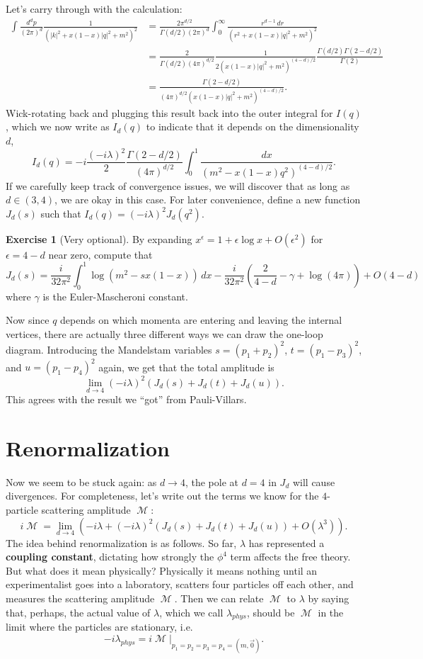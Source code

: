 \documentclass{report}
\theoremstyle{plain}
\theoremstyle{definition}
\newtheorem{exercise}{Exercise}[section]
\theoremstyle{remark}
\DeclareMathOperator{\cM}{\mathcal{M}}
\begin{document}
Let's carry through with the calculation:
\begin{align*}
  \int \frac{d^dp}{(2\pi)^d} \frac{1}{(|k|^2 + x(1 - x)|q|^2 + m^2)^2}
  &= \frac{2\pi^{d/2}}{\Gamma(d/2)(2\pi)^d} \int_0^\infty \frac{r^{d-1} \, dr}{(r^2 + x(1-x)|q|^2 + m^2)^2} \\
  &= \frac{2}{\Gamma(d/2) (4\pi)^{d/2}} \frac{1}{2(x(1-x)|q|^2 + m^2)^{(4-d)/2}} \frac{\Gamma(d/2) \Gamma(2 - d/2)}{\Gamma(2)} \\
  &= \frac{\Gamma(2-d/2)}{(4\pi)^{d/2} (x(1-x)|q|^2 + m^2)^{(4-d)/2}}.
\end{align*}
Wick-rotating back and plugging this result back into the outer
integral for $I(q)$, which we now write as $I_d(q)$ to indicate that
it depends on the dimensionality $d$,
$$ I_d(q) = -i\frac{(-i\lambda)^2}{2} \frac{\Gamma(2 - d/2)}{(4\pi)^{d/2}} \int_0^1 \frac{dx}{(m^2 - x(1-x)q^2)^{(4-d)/2}}. $$
If we carefully keep track of convergence issues, we will discover
that as long as $d \in (3, 4)$, we are okay in this case. For later
convenience, define a new function $J_d(s)$ such that
$I_d(q) = (-i\lambda)^2 J_d(q^2)$.

\begin{exercise}[Very optional]
  By expanding $x^\epsilon = 1 + \epsilon \log x + O(\epsilon^2)$ for
  $\epsilon = 4 - d$ near zero, compute that
  $$ J_d(s) = \frac{i}{32\pi^2} \int_0^1 \log(m^2 - sx(1-x)) \, dx - \frac{i}{32\pi^2}\left(\frac{2}{4-d} - \gamma + \log(4\pi)\right) + O(4-d) $$
  where $\gamma$ is the Euler-Mascheroni constant.
\end{exercise}

Now since $q$ depends on which momenta are entering and leaving the
internal vertices, there are actually three different ways we can draw
the one-loop diagram. Introducing the Mandelstam variables
$s = (p_1 + p_2)^2$, $t = (p_1 - p_3)^2$, and $u = (p_1 - p_4)^2$
again, we get that the total amplitude is
$$ \lim_{d \to 4} (-i\lambda)^2(J_d(s) + J_d(t) + J_d(u)). $$
This agrees with the result we ``got'' from Pauli-Villars.

\section{Renormalization}

Now we seem to be stuck again: as $d \to 4$, the pole at $d = 4$ in
$J_d$ will cause divergences. For completeness, let's write out the
terms we know for the $4$-particle scattering amplitude $\cM$:
$$ i\cM = \lim_{d \to 4} \left(-i\lambda + (-i\lambda)^2(J_d(s) + J_d(t) + J_d(u)) + O(\lambda^3)\right). $$
The idea behind renormalization is as follows. So far, $\lambda$ has
represented a {\bf coupling constant}, dictating how strongly the
$\phi^4$ term affects the free theory. But what does it mean
physically? Physically it means nothing until an experimentalist goes
into a laboratory, scatters four particles off each other, and
measures the scattering amplitude $\cM$. Then we can relate $\cM$ to
$\lambda$ by saying that, perhaps, the actual value of $\lambda$,
which we call $\lambda_{phys}$, should be $\cM$ in the limit where the
particles are stationary, i.e.
$$ -i\lambda_{phys} = i\cM|_{p_1=p_2=p_3=p_4=(m,\vec{0})}. $$
\end{document}

